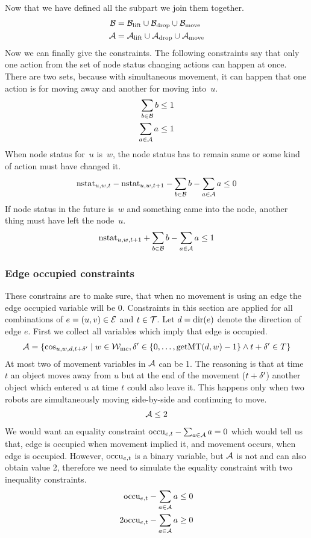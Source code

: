 Now that we have defined all the subpart we join them together.
\begin{align}
    \mathcal{B} &= \mathcal{B}_{\mathrm{lift}} \cup \mathcal{B}_{\mathrm{drop}} \cup \mathcal{B}_{\mathrm{move}} \\
    \mathcal{A} &= \mathcal{A}_{\mathrm{lift}} \cup \mathcal{A}_{\mathrm{drop}} \cup \mathcal{A}_{\mathrm{move}}
\end{align}
Now we can finally give the constraints. The following constraints say that
only one action from the set of node status changing actions can happen at
once. There are two sets, because with simultaneous movement, it can happen
that one action is for moving away and another for moving into~$u$.
\begin{align}
    \sum_{b \in \mathcal{B}} b \leq 1\\
    \sum_{a \in \mathcal{A}} a \leq 1
\end{align}
When node status for~$u$ is~$w$, the node status has to remain same or some
kind of action must have changed it.
\begin{align}
    \mathrm{nstat}_{u,w,t} - \mathrm{nstat}_{u,w,t+1} -\sum_{b \in \mathcal{B}} b -\sum_{a \in \mathcal{A}} a
    \leq 0
\end{align}
If node status in the future is~$w$ and something came into the node, another
thing must have left the node~$u$.
\begin{align}
    \mathrm{nstat}_{u,w,t+1} +\sum_{b \in \mathcal{B}} b -\sum_{a \in \mathcal{A}} a
    \leq 1
\end{align}
\subsubsection{Edge occupied constraints}
These constrains are to make sure, that when no movement is using an edge the
edge occupied variable will be 0. Constraints in this section are applied for
all combinations of $e=(u,v) \in \mathcal{E}$ and $t \in \mathcal{T}$.
Let $d=\mathrm{dir}(e)$ denote the direction of edge $e$. First we collect all variables
which imply that edge is occupied.
\begin{align}
    \mathcal{A} = \{\cos_{u,w,d,t+\delta'} \mid w \in \mathcal{W}_\mathrm{mc}, \delta' \in
    \{0,\ldots,\mathrm{getMT}(d,w)-1\} \wedge t+\delta' \in T\}
\end{align}
At most two of movement
variables in $\mathcal{A}$ can be 1. The reasoning is that at time $t$ an object moves
away from $u$ but at the end of the movement ($t+\delta'$) another object which
entered $u$ at time $t$ could also leave it. This happens only when two robots
are simultaneously moving side-by-side and continuing to move.
\begin{align}
    \mathcal{A} \leq 2
\end{align}
We would want an equality constraint $\mathrm{occu}_{e,t} - \sum_{a \in \mathcal{A}} a = 0$
which would tell us that, edge is occupied when movement implied it, and
movement occurs, when edge is occupied. However, $\mathrm{occu}_{e,t}$ is a binary
variable, but $\mathcal{A}$ is not and can also obtain value 2, therefore we need to
simulate the equality constraint with two inequality constraints.
\begin{align}
    \mathrm{occu}_{e,t} - \sum_{a \in \mathcal{A}}a &\leq 0\\
    2\mathrm{occu}_{e,t} - \sum_{a \in \mathcal{A}}a &\geq 0
\end{align}
